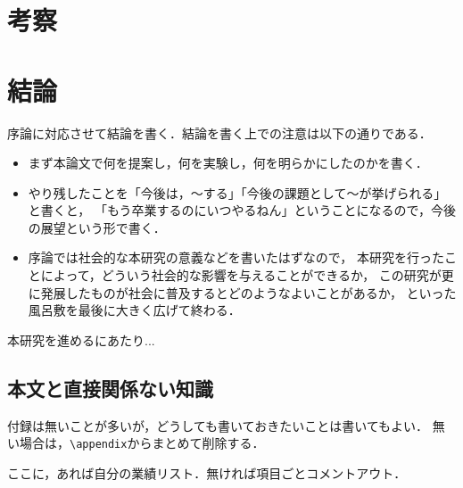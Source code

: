 \documentclass[book,paper=a4,fontsize=10pt,jafontscale=0.92]{jlreq}
\begin{document}
\chapter{考察}

\chapter{結論}

序論に対応させて結論を書く．結論を書く上での注意は以下の通りである．
\begin{itemize}
 \item まず本論文で何を提案し，何を実験し，何を明らかにしたのかを書く．
 \item やり残したことを「今後は，〜する」「今後の課題として〜が挙げられる」と書くと，
       「もう卒業するのにいつやるねん」ということになるので，今後の展望という形で書く．
 \item 序論では社会的な本研究の意義などを書いたはずなので，
       本研究を行ったことによって，どういう社会的な影響を与えることができるか，
       この研究が更に発展したものが社会に普及するとどのようなよいことがあるか，
       といった風呂敷を最後に大きく広げて終わる．
\end{itemize}


\acknowledgements

本研究を進めるにあたり...








\appendix

\section{本文と直接関係ない知識}

付録は無いことが多いが，どうしても書いておきたいことは書いてもよい．
無い場合は，\verb|\appendix|からまとめて削除する．


\papers %

ここに，あれば自分の業績リスト．無ければ項目ごとコメントアウト．
\end{document}
